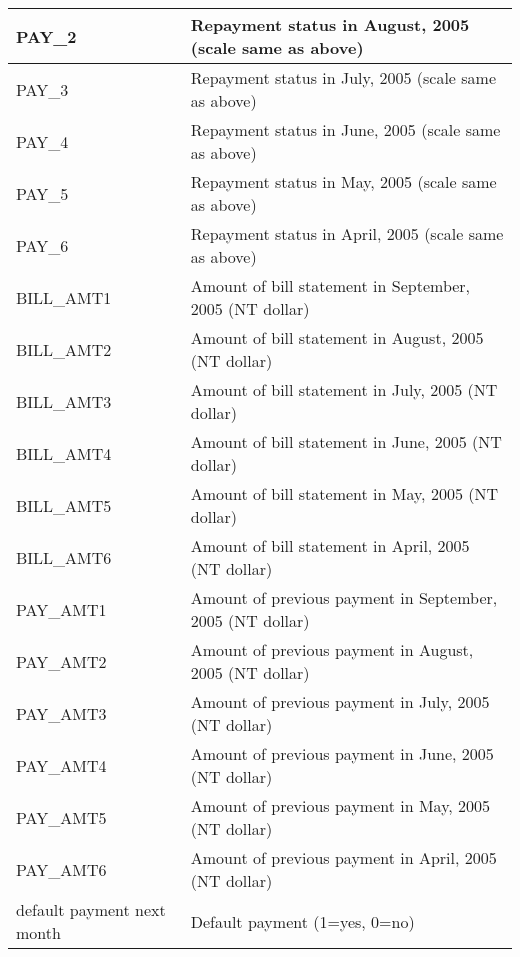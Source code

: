 \begin{table}
{\begin{tabular}{|l|l|}
PAY\_2                     &        
Repayment status in August, 2005 (scale same as above)\\ \hline
PAY\_3                     &          Repayment status in July, 2005 (scale same as above)            \\ \hline
PAY\_4                     &            Repayment status in June, 2005 (scale same as above)          \\ \hline
PAY\_5                     &            Repayment status in May, 2005 (scale same as above)          \\ \hline
PAY\_6                     &           Repayment status in April, 2005 (scale same as above)           \\ \hline
BILL\_AMT1                 &           Amount of bill statement in September, 2005 (NT dollar)           \\ \hline
BILL\_AMT2                 &            Amount of bill statement in August, 2005 (NT dollar)          \\ \hline
BILL\_AMT3                 &              Amount of bill statement in July, 2005 (NT dollar)        \\ \hline
BILL\_AMT4                 &            Amount of bill statement in June, 2005 (NT dollar)          \\ \hline
BILL\_AMT5                 &           Amount of bill statement in May, 2005 (NT dollar)           \\ \hline
BILL\_AMT6                 &           Amount of bill statement in April, 2005 (NT dollar)           \\ \hline
PAY\_AMT1                  &               Amount of previous payment in September, 2005 (NT dollar)       \\ \hline
PAY\_AMT2                  &          Amount of previous payment in August, 2005 (NT dollar)            \\ \hline
PAY\_AMT3                  &              Amount of previous payment in July, 2005 (NT dollar)        \\ \hline
PAY\_AMT4                  &              Amount of previous payment in June, 2005 (NT dollar)        \\ \hline
PAY\_AMT5                  &              Amount of previous payment in May, 2005 (NT dollar)        \\ \hline
PAY\_AMT6                  &           Amount of previous payment in April, 2005 (NT dollar)           \\ \hline
default payment next month &             Default payment (1=yes, 0=no)         \\ \hline
\end{tabular}}
\end{table}
